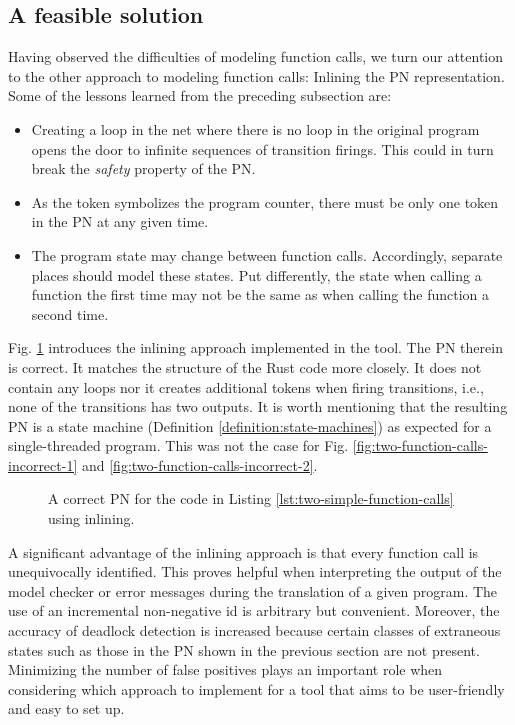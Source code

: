 \clearpage
\subsection{A feasible solution}

Having observed the difficulties of modeling function calls,
we turn our attention to the other approach to modeling function calls:
Inlining the \acrshort{PN} representation.
Some of the lessons learned from the preceding subsection are:

\begin{itemize}
    \item Creating a loop in the net where there is no loop in the original program
          opens the door to infinite sequences of transition firings.
          This could in turn break the \emph{safety} property of the \acrshort{PN}.
    \item As the token symbolizes the program counter,
          there must be only one token in the \acrshort{PN} at any given time.
    \item The program state may change between function calls.
          Accordingly, separate places should model these states.
          Put differently, the state when calling a function the first time
          may not be the same as when calling the function a second time.
\end{itemize}

Fig. \ref{fig:two-function-calls-correct} introduces
the inlining approach implemented in the tool.
The \acrshort{PN} therein is correct.
It matches the structure of the Rust code more closely.
It does not contain any loops nor
it creates additional tokens when firing transitions,
i.e., none of the transitions has two outputs.
It is worth mentioning that the resulting \acrshort{PN} is a state machine
(Definition \ref{definition:state-machines})
as expected for a single-threaded program.
This was not the case for Fig. \ref{fig:two-function-calls-incorrect-1}
and \ref{fig:two-function-calls-incorrect-2}.

\begin{figure}[!htbp]
    \centering
    
    \caption{A correct \acrshort{PN} for the code
        in Listing \ref{lst:two-simple-function-calls} using inlining.}
    \label{fig:two-function-calls-correct}
\end{figure}

A significant advantage of the inlining approach is
that every function call is unequivocally identified.
This proves helpful when interpreting the output of the model checker or
error messages during the translation of a given program.
The use of an incremental non-negative id is arbitrary but convenient.
Moreover, the accuracy of deadlock detection is increased because
certain classes of extraneous states
such as those in the \acrshort{PN} shown in the previous section
are not present.
Minimizing the number of false positives plays an important role
when considering which approach to implement
for a tool that aims to be user-friendly and easy to set up.

